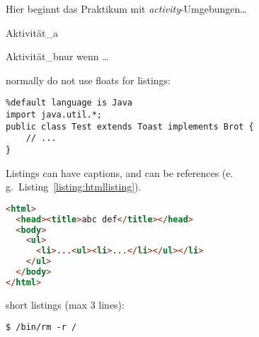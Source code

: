 \varactivitiessection
Hier beginnt das Praktikum mit \textit{activity}-Umgebungen\dots

\lipsum[17]

\begin{activity}{Aktivität\_a}{}
    \lipsum[18-19]
\end{activity}

\begin{activity}{Aktivität\_b}{nur wenn \dots}
    \lipsum[20]
\end{activity}

normally do not use floats for listings:
\begin{lstlisting}%default language is Java
import java.util.*;
public class Test extends Toast implements Brot {
    // ...
}
\end{lstlisting}

Listings can have captions, and can be references (e.\,g.~Listing~\ref{listing:htmllisting}).
\begin{lstlisting}[language=HTML, caption={sourcecode in different languages possible, can have a caption}, label=listing:htmllisting]
<html>
  <head><title>abc def</title></head>
  <body>
    <ul>
      <li>...<ul><li>...</li></ul></li>
    </ul>
  </body>
</html>
\end{lstlisting}

short listings (max 3 lines):
\begin{lstlisting}[style=nonumbers]
$ /bin/rm -r /
\end{lstlisting}

